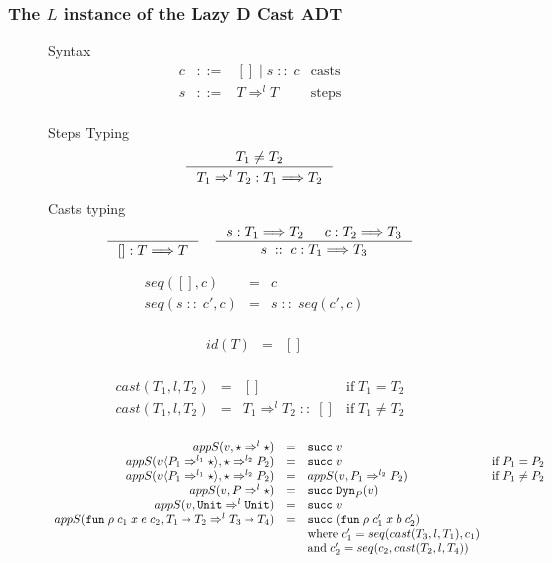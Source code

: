 \documentclass[acmsmall,review,anonymous]{acmart}\settopmatter{printfolios=true,printccs=false,printacmref=false}
\newcommand{\stxrule}[3]{#1 & ::= & #3 & \text{#2}\\}
\newcommand{\funrule}[3]{#1 &=& #2 & #3\\}
\newcommand{\judgeTypeFT}[3]{#1 : #2 \Longrightarrow #3} %
\newcommand{\POOunit}[0]{\mathtt{Unit}}
\newcommand{\POOfun}[2]{#1 \shortrightarrow #2}
\newcommand{\cOOcast}[3]{#1 \Rightarrow^{#2} #3}
\newcommand{\vOOcast}[2]{#1\langle#2\rangle}
\newcommand{\rOOsucc}[1]{\mathtt{succ}\;#1}
\newcommand{\hcvOOinj}[2]{\mathtt{Dyn}_{#1}(#2)}
\newcommand{\hcvOOfun}[5]{\mathtt{fun} \; #2 \; #1 \; #3 \; #4 \; #5}
\newcommand{\sidecond}[1]{\text{if}\;#1}
\newcommand{\lsOOcast}[3]{\cOOcast{#1}{#2}{#3}}
\newcommand{\lcOOnull}[0]{[]}
\newcommand{\lcOOcons}[2]{#1 \; :: \; #2}
\begin{document}
\subsubsection{The $L$ instance of the Lazy D Cast ADT}

\begin{figure}
Syntax
\[
\begin{array}{rclr}
\stxrule{c}{casts}{\lcOOnull{} \mid \lcOOcons{s}{c}}
\stxrule{s}{steps}{\lsOOcast{T}{l}{T}}
\end{array}
\]

Steps Typing
\fbox{$\judgeTypeFT{s}{T}{T}$}
\begin{gather*}
\inference{
  T_1 \neq T_2
}{
  \judgeTypeFT{\lsOOcast{T_1}{l}{T_2}}{T_1}{T_2}
}
\end{gather*}

Casts typing
\fbox{$\judgeTypeFT{c}{T}{T}$}
\begin{gather*}
\inference{
}{
  \judgeTypeFT{\lcOOnull}{T}{T}
}
\quad
\inference{
  \judgeTypeFT{s}{T_1}{T_2} &
  \judgeTypeFT{c}{T_2}{T_3}
}{
  \judgeTypeFT{\lcOOcons{s}{c}}{T_1}{T_3}
}
\end{gather*}

\[
\begin{array}{rclr}
\funrule{seq(\lcOOnull,c)}{c}{}
\funrule{seq(\lcOOcons{s}{c'},c)}{\lcOOcons{s}{seq(c',c)}}{}
\end{array}
\]

\[
\begin{array}{rclr}
\funrule{id(T)}{\lcOOnull}{}
\end{array}
\]

\[
\begin{array}{rclc}
\funrule{cast(T_1,l,T_2)}{
  \lcOOnull
}{
  \sidecond{T_1 = T_2}
}
\funrule{cast(T_1,l,T_2)}{
  \lcOOcons{\lsOOcast{T_1}{l}{T_2}}{\lcOOnull}
}{
  \sidecond{T_1 \neq T_2}
}
\end{array}
\]

  
\[
\begin{array}{rclr}
\funrule{
  appS(v,\cOOcast{\star}{l}{\star})
}{
  \rOOsucc{v}
}{}
\funrule{
  appS(\vOOcast{v}{\cOOcast{P_1}{l_1}{\star}},\cOOcast{\star}{l_2}{P_2})
}{
  \rOOsucc{v}
}{\sidecond{P_1 = P_2}}
\funrule{
appS(\vOOcast{v}{\cOOcast{P_1}{l_1}{\star}},\cOOcast{\star}{l_2}{P_2})
}{
appS(v,\cOOcast{P_1}{l_2}{P_2})
}{\sidecond{P_1 \neq P_2}}
\funrule{
  appS(v,\cOOcast{P}{l}{\star})
}{
  \rOOsucc{\hcvOOinj{P}{v}}
}{}
\funrule{
  appS(v,\lsOOcast{\POOunit}{l}{\POOunit})
}{
  \rOOsucc{v}
}{}
\funrule{
  appS(
    \hcvOOfun{c_1}{\rho}{x}{e}{c_2},
    \lsOOcast{\POOfun{T_1}{T_2}}{l}{\POOfun{T_3}{T_4}})
}{
  \rOOsucc{(\hcvOOfun{c_1'}{\rho}{x}{b}{c_2'})}
}{
  \\ &&
  \text{where} \;
  c_1' = seq(cast(T_3,l,T_1),c_1)
  \\ &&
  \text{and} \;
  c_2' = seq(c_2,cast(T_2,l,T_4))
}


\end{array}\]
\end{figure}
\end{document}
